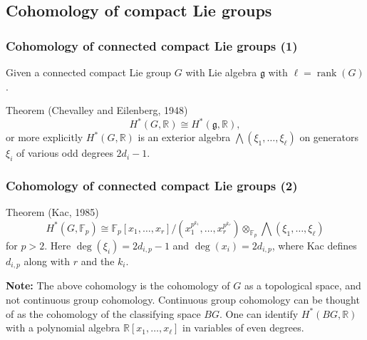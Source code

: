 \documentclass{beamer}
\newcommand*\R{\mathbb{R}}
\newcommand*\F{\mathbb{F}}
\DeclareMathOperator{\rank}{rank} %
\newcommand*{\lie}[1]{\mathfrak{#1}} %
\newcommand*\iso{\cong} %
\begin{document}




\subsection{Cohomology of compact Lie groups}

\begin{frame}
  \frametitle{Cohomology of connected compact Lie groups (1)}

  Given a connected compact Lie group $G$ with Lie algebra $\lie{g}$ with $\ell = \rank(G)$.
  \begin{block}{Theorem (Chevalley and Eilenberg, 1948)}
    \[
      H^{*}(G,\R) \iso H^{*}(\lie{g},\R),
    \]
    or more explicitly $H^{*}(G,\R)$ is an exterior algebra $\bigwedge (\xi_{1},\dotsc,\xi_{\ell})$ on generators $\xi_{i}$ of various odd degrees $2d_{i}-1$.
  \end{block}
\end{frame}

\begin{frame}
  \frametitle{Cohomology of connected compact Lie groups (2)}

  \begin{block}{Theorem (Kac, 1985)}
    \[
      H^{*}(G,\F_{p}) \iso \F_{p}[x_{1},\dotsc,x_{r}]/(x_{1}^{p^{k_{1}}}, \dotsc, x_{r}^{p^{k_{r}}}) \otimes_{\F_{p}} \bigwedge (\xi_{1},\dotsc,\xi_{\ell})
    \]
    for $p>2$. Here $\deg(\xi_{i}) = 2d_{i,p} - 1$ and $\deg(x_{i}) = 2d_{i,p}$, where Kac defines $d_{i,p}$ along with $r$ and the $k_{i}$.
  \end{block}
  \pause
  \textbf{Note:} The above cohomology is the cohomology of $G$ as a topological space, and not continuous group cohomology. Continuous group cohomology can be thought of as the cohomology of the classifying space $BG$. One can identify $H^{*}(BG,\R)$ with a polynomial algebra $\R[x_{1},\dotsc,x_{\ell}]$ in variables of even degrees.
\end{frame}
\end{document}
